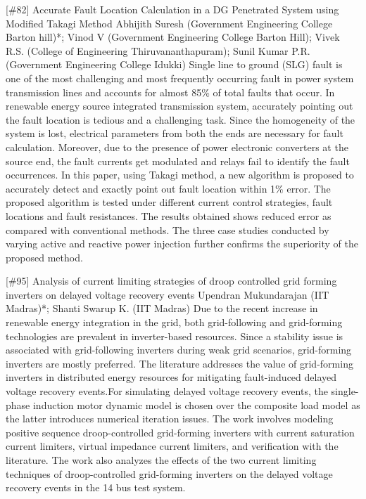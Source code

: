 {} \begin{abstract_online} {[\#82] Accurate Fault Location Calculation in a DG Penetrated System using Modified Takagi Method} {} {Abhijith Suresh (Government Engineering College Barton hill)*; Vinod V (Government Engineering College Barton Hill); Vivek R.S. (College of Engineering Thiruvananthapuram); Sunil Kumar P.R. (Government Engineering College Idukki)} {} Single line to ground (SLG) fault is one of the most challenging and most frequently occurring fault in power system transmission lines and accounts for almost 85\% of total faults that occur. In renewable energy source integrated transmission system, accurately pointing out the fault location is tedious and a challenging task. Since the homogeneity of the system is lost, electrical parameters from both the ends are necessary for fault calculation. Moreover, due to the presence of power electronic converters at the source end, the fault currents get modulated and relays fail to identify the fault occurrences. In this paper, using Takagi method, a new algorithm is proposed to accurately detect and exactly point out fault location within 1\% error. The proposed algorithm is tested under different current control strategies, fault locations and fault resistances. The results obtained shows reduced error as compared with conventional methods. The three case studies conducted by varying active and reactive power injection further confirms the superiority of the proposed method. \end{abstract_online} 
{} \begin{abstract_online} {[\#95] Analysis of current limiting strategies of droop controlled grid forming inverters on delayed voltage recovery events} {} {Upendran Mukundarajan (IIT Madras)*; Shanti Swarup K. (IIT Madras)} {} Due to the recent increase in renewable energy integration in the grid, both grid-following and grid-forming technologies are prevalent in inverter-based resources. Since a stability issue is associated with grid-following inverters during weak grid scenarios, grid-forming inverters are mostly preferred. The literature addresses the value of grid-forming inverters in distributed energy resources for mitigating fault-induced delayed voltage recovery events.For simulating delayed voltage recovery events, the single-phase induction motor dynamic model is chosen over the composite load model as the latter introduces numerical iteration issues. The work involves modeling positive sequence droop-controlled grid-forming inverters with current saturation current limiters, virtual impedance current limiters, and verification with the literature. The work also analyzes the effects of the two current limiting techniques of droop-controlled grid-forming inverters on the delayed voltage recovery events in the 14 bus test system. \end{abstract_online} 
